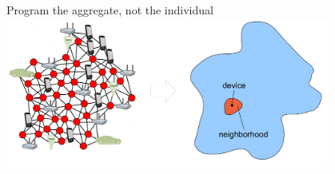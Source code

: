 \documentclass[presentation, 8pt,169]{beamer}\mode<presentation>{\usetheme{AMSBolognaFC}}
\begin{document}
\begin{frame}[plain]
\begin{center}
\Huge{}
\end{center}
\centering
\large{Program the aggregate, not the individual}
\\ \vspace{0.5cm}
\includegraphics[width=0.8\textwidth]{img/ac.png}
\end{frame}
\end{document}
